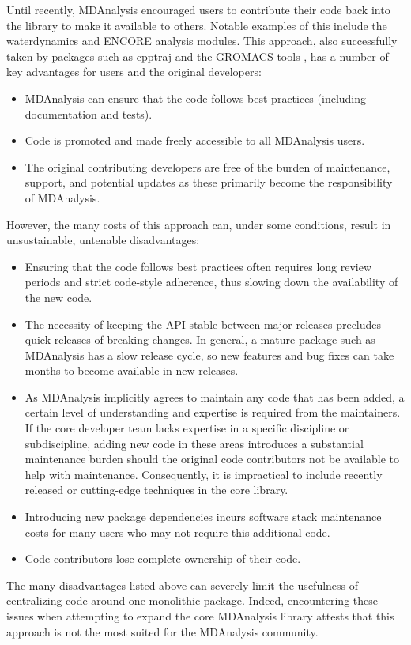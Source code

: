\documentclass[9pt,whitepaper]{livecoms}
\begin{document}
Until recently, MDAnalysis encouraged users to contribute their code back into the library to make it available to others. Notable examples of this include the waterdynamics \cite{araya-secchi_characterization_2014} and ENCORE \cite{tiberti_encore_2015} analysis modules. This approach, also successfully taken by packages such as cpptraj \cite{roe_ptraj_2013} and the GROMACS tools \cite{abraham_gromacs_2015}, has a number of key advantages for users and the original developers:
\begin{itemize}
    \item MDAnalysis can ensure that the code follows best practices (including documentation and tests).
    \item Code is promoted and made freely accessible to all MDAnalysis users.
    \item The original contributing developers are free of the burden of maintenance, support, and potential updates as these primarily become the responsibility of MDAnalysis.
\end{itemize}
However, the many costs of this approach can, under some conditions, result in unsustainable, untenable disadvantages:
\begin{itemize}
    \item Ensuring that the code follows best practices often requires long review periods and strict code-style adherence, thus slowing down the availability of the new code.
    \item The necessity of keeping the API stable between major releases precludes quick releases of breaking changes. In general, a mature package such as MDAnalysis has a slow release cycle, so new features and bug fixes can take months to become available in new releases.
    \item As MDAnalysis implicitly agrees to maintain any code that has been added, a certain level of understanding and expertise is required from the maintainers. If the core developer team lacks expertise in a specific discipline or subdiscipline, adding new code in these areas introduces a substantial maintenance burden should the original code contributors not be available to help with maintenance. Consequently, it is impractical to include recently released or cutting-edge techniques in the core library.
    \item Introducing new package dependencies incurs software stack maintenance costs for many users who may not require this additional code.
    \item Code contributors lose complete ownership of their code.
\end{itemize}
The many disadvantages listed above can severely limit the usefulness of centralizing code around one monolithic package. Indeed, encountering these issues when attempting to expand the core MDAnalysis library attests that this approach is not the most suited for the MDAnalysis community.
\end{document}
